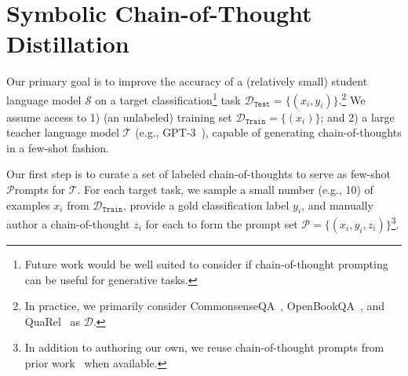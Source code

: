 \documentclass[11pt]{article}
\begin{document}









\section{Symbolic Chain-of-Thought Distillation}
\label{sec:approach}
Our primary goal is to improve the accuracy of a (relatively small) student language model $\mathcal{S}$ on a target classification\footnote{Future work would be well suited to consider if chain-of-thought prompting can be useful for generative tasks.} task $\mathcal{D}_{\texttt{Test}} = \{(x_i, y_i)\}$.\footnote{In practice, we primarily consider CommonsenseQA~\cite{talmor2019commonsenseqa}, OpenBookQA~\cite{OpenBookQA2018}, and QuaRel~\cite{tafjord2019quarel} as $\mathcal{D}$.} We assume access to 1) (an unlabeled) training set $\mathcal{D}_{\texttt{Train}} = \{(x_i)\}$; and 2) a large teacher language model $\mathcal{T}$ (e.g., GPT-3~\cite{NEURIPS2020_1457c0d6}), capable of generating chain-of-thoughts in a few-shot fashion.

Our first step is to curate a set of labeled chain-of-thoughts to serve as few-shot $\mathcal{P}$rompts for $\mathcal{T}$. For each target task, we sample a small number (e.g., 10) of examples $x_i$ from $\mathcal{D}_{\texttt{Train}}$, provide a gold classification label $y_i$, and manually author a chain-of-thought $z_i$ for each to form the prompt set $ \mathcal{P} = \{(x_i, y_i, z_i)\} $\footnote{In addition to authoring our own, we reuse chain-of-thought prompts from prior work~\citep{wei2022chain,wang2022self} when available.}.
\end{document}
